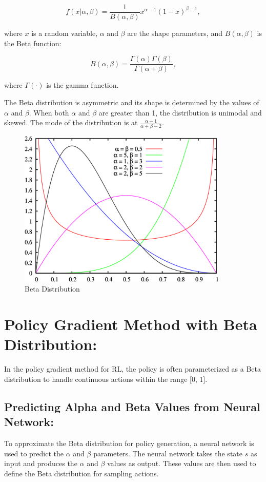 \begin{equation}
    f(x | \alpha, \beta) = \frac{1}{B(\alpha, \beta)} x^{\alpha - 1}(1 - x)^{\beta - 1},\label{eq:equation4}
\end{equation}

where $x$ is a random variable, $\alpha$ and $\beta$ are the shape parameters, and $B(\alpha, \beta)$ is the Beta function:

\begin{equation}
    B(\alpha, \beta) = \frac{\Gamma(\alpha) \Gamma(\beta)}{\Gamma(\alpha + \beta)},\label{eq:equation3}
\end{equation}

where $\Gamma(\cdot)$ is the gamma function.

The Beta distribution is asymmetric and its shape is determined by the values of $\alpha$ and $\beta$. When both $\alpha$ and $\beta$ are greater than 1, the distribution is unimodal and skewed.
The mode of the distribution is at $\frac{\alpha - 1}{\alpha + \beta - 2}$.

\begin{figure}[H]
    \centering
    \includegraphics[width=10cm]{assets/beta}
    \caption{Beta Distribution}\label{fig:beta-distribution}
\end{figure}

\section{Policy Gradient Method with Beta Distribution:}\label{sec:policy-gradient-method-with-beta-distribution:}
In the policy gradient method for RL, the policy is often parameterized as a Beta distribution to handle continuous actions within the range [0, 1].

\subsection{Predicting Alpha and Beta Values from Neural Network:}\label{subsec:predicting-alpha-and-beta-values-from-neural-network:}
To approximate the Beta distribution for policy generation, a neural network is used to predict the $\alpha$ and $\beta$ parameters.
The neural network takes the state $s$ as input and produces the $\alpha$ and $\beta$ values as output.
These values are then used to define the Beta distribution for sampling actions.

